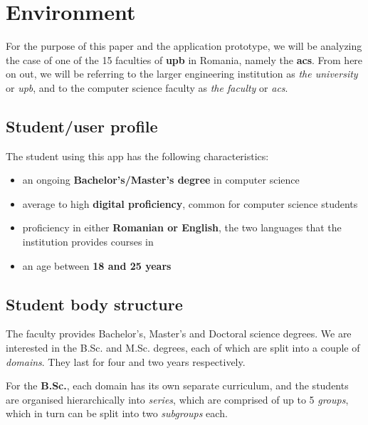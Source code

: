 \section{Environment} \label{1:environment}

    For the purpose of this paper and the application prototype, we will be analyzing the case of one of the 15 faculties \cite{upb2020faculties} of \textbf{\acrlong{upb}} in Romania, namely the \textbf{\acrlong{acs}}. From here on out, we will be referring to the larger engineering institution as \textit{the university} or \textit{\acrshort{upb}}, and to the computer science faculty as \textit{the faculty} or \textit{\acrshort{acs}}.
    
    \subsection{Student/user profile} \label{2:student_profile}
    
        The student using this app has the following characteristics:
        \begin{itemize}
            \item an ongoing \textbf{Bachelor's/Master's degree} in computer science
            \item average to high \textbf{digital proficiency}, common for computer science students%
            \item proficiency in either \textbf{Romanian or English}, the two languages that the institution provides courses in%
            \item an age between \textbf{18 and 25 years}
        \end{itemize}
        
    \subsection{Student body structure} \label{1:student_body_structure}
    
        The faculty provides Bachelor's, Master's and Doctoral science degrees. We are interested in the B.Sc. and M.Sc. degrees, each of which are split into a couple of \textit{domains}. They last for four and two years respectively.
        
        For the \textbf{B.Sc.}, each domain has its own separate curriculum, and the students are organised hierarchically into \textit{series}, which are comprised of up to 5 \textit{groups}, which in turn can be split into two \textit{subgroups} each.
        
